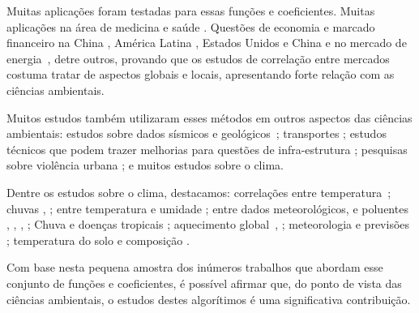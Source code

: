 Muitas aplicações foram testadas para essas funções e coeficientes. Muitas aplicações na área de medicina e saúde \cite{CHEN2018171, FILHO2023128802, GE2023114155, GHOSH2018392}. Questões de economia e marcado financeiro na China \cite{LI2024123716}, América Latina \cite{CONTRERASREYES2024130115}, Estados Unidos e China \cite{CHEN2024e36537} e no mercado de energia~\cite{ASLAM2024102085}, detre outros, provando que os estudos de correlação entre mercados costuma tratar de aspectos globais e locais, apresentando forte relação com as ciências ambientais.

Muitos estudos também utilizaram esses métodos em outros aspectos das ciências ambientais: estudos sobre dados sísmicos \cite{shadkhooMultifractalDetrendedCrosscorrelation2009} e geológicos~\cite{BIANCHI2018377, QIN2024108559}; transportes \cite{SHI2018165, ZEBENDE20111677, ZEBENDE20094863}; estudos técnicos que podem trazer melhorias para questões de infra-estrutura \cite{RODRIGUESSANTOS2018294}; pesquisas sobre violência urbana \cite{MACHADOFILHO201412}; e muitos estudos sobre o clima.

Dentre os estudos sobre o clima, destacamos: correlações entre temperatura~\cite{YU2019122034}; chuvas \cite{ADARSH2020124913}, \cite{LI2024131535}; entre temperatura e umidade \cite{ZEBENDE201817}; entre dados meteorológicos, e poluentes \cite{SHI2014130}, \cite{HE201747}, \cite{ZHANG2015114}, \cite{SHEN2015417}; Chuva e doenças tropicais \cite{OLIVEIRA2023160491}; aquecimento global~\cite{CHATTERJEE2021125815}, \cite{YUAN201471}; meteorologia e previsões \cite{AFUECHETA2021100295, SHIN2019778}; temperatura do solo e composição \cite{KAR2019236}.

Com base nesta pequena amostra dos inúmeros trabalhos que abordam esse conjunto de funções e coeficientes, é possível afirmar que, do ponto de vista das ciências ambientais, o estudos destes algorítimos é uma significativa contribuição.



